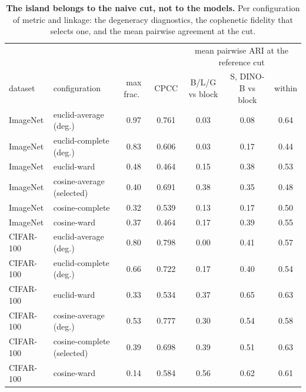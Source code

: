 \begin{table}[H]
\centering
\scriptsize
\setlength{\tabcolsep}{3pt}
\begingroup
\setlength{\tabcolsep}{3pt}
\begin{tabular}{llcc|ccc}
\toprule
 & & & & \multicolumn{3}{c}{mean pairwise ARI at the reference cut} \\
dataset & configuration & max frac.\ & CPCC & B/L/G vs block & S, DINO-B vs block & within \\
\midrule
ImageNet & euclid-average (deg.) & 0.97 & 0.761 & 0.03 & 0.08 & 0.64 \\
ImageNet & euclid-complete (deg.) & 0.83 & 0.606 & 0.03 & 0.17 & 0.44 \\
ImageNet & euclid-ward & 0.48 & 0.464 & 0.15 & 0.38 & 0.53 \\
ImageNet & cosine-average (selected) & 0.40 & 0.691 & 0.38 & 0.35 & 0.48 \\
ImageNet & cosine-complete & 0.32 & 0.539 & 0.13 & 0.17 & 0.50 \\
ImageNet & cosine-ward & 0.37 & 0.464 & 0.17 & 0.39 & 0.55 \\
\midrule
CIFAR-100 & euclid-average (deg.) & 0.80 & 0.798 & 0.00 & 0.41 & 0.57 \\
CIFAR-100 & euclid-complete (deg.) & 0.66 & 0.722 & 0.17 & 0.40 & 0.54 \\
CIFAR-100 & euclid-ward & 0.33 & 0.534 & 0.37 & 0.65 & 0.63 \\
CIFAR-100 & cosine-average (deg.) & 0.53 & 0.777 & 0.30 & 0.54 & 0.58 \\
CIFAR-100 & cosine-complete (selected) & 0.39 & 0.698 & 0.39 & 0.51 & 0.63 \\
CIFAR-100 & cosine-ward & 0.14 & 0.584 & 0.56 & 0.62 & 0.61 \\
\bottomrule
\end{tabular}
\par\vspace{2pt}
\endgroup
\caption{\textbf{The island belongs to the naive cut, not to the models.} Per configuration of metric and linkage: the degeneracy diagnostics, the cophenetic fidelity that selects one, and the mean pairwise agreement at the cut.
}
\label{tab:q6-treemap}
\end{table}
